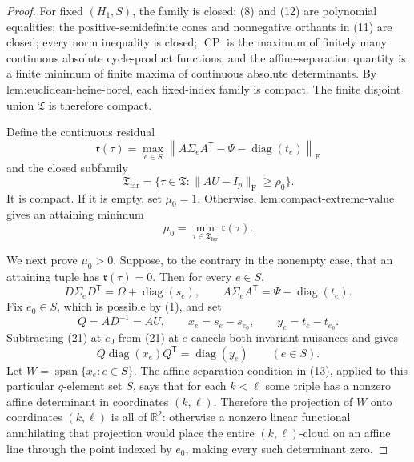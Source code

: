 \documentclass{article}
\begin{document}
\begin{proof}
For fixed \((H_1,S)\), the family is closed: (8) and (12) are polynomial equalities; the positive-semidefinite cones and nonnegative orthants in (11) are closed; every norm inequality is closed; \(\operatorname{CP}\) is the maximum of finitely many continuous absolute cycle-product functions; and the affine-separation quantity is a finite minimum of finite maxima of continuous absolute determinants. By \(\text{lem:euclidean-heine-borel}\), each fixed-index family is compact. The finite disjoint union \(\mathfrak T\) is therefore compact.

Define the continuous residual
\[
\mathfrak r(\tau)=
\max_{e\in S}
\left\|A\Sigma_eA^{\mathsf T}
-\Psi-\operatorname{diag}(t_e)\right\|_{\mathrm F}
\tag{18}
\]
and the closed subfamily
\[
\mathfrak T_{\mathrm{far}}
=\{\tau\in\mathfrak T:\|AU-I_p\|_{\mathrm F}\geq\rho_0\}.
\tag{19}
\]
It is compact. If it is empty, set \(\mu_0=1\). Otherwise, \(\text{lem:compact-extreme-value}\) gives an attaining minimum
\[
\mu_0=\min_{\tau\in\mathfrak T_{\mathrm{far}}}\mathfrak r(\tau).
\tag{20}
\]

We next prove \(\mu_0>0\). Suppose, to the contrary in the nonempty case, that an attaining tuple has \(\mathfrak r(\tau)=0\). Then for every \(e\in S\),
\[
D\Sigma_eD^{\mathsf T}=\Omega+\operatorname{diag}(s_e),
\qquad
A\Sigma_eA^{\mathsf T}=\Psi+\operatorname{diag}(t_e).
\tag{21}
\]
Fix \(e_0\in S\), which is possible by (1), and set
\[
Q=AD^{-1}=AU,
\qquad
x_e=s_e-s_{e_0},
\qquad
y_e=t_e-t_{e_0}.
\]
Subtracting (21) at \(e_0\) from (21) at \(e\) cancels both invariant nuisances and gives
\[
Q\operatorname{diag}(x_e)Q^{\mathsf T}
=\operatorname{diag}(y_e)
\qquad(e\in S).
\tag{22}
\]
Let \(W=\operatorname{span}\{x_e:e\in S\}\). The affine-separation condition in (13), applied to this particular \(q\)-element set \(S\), says that for each \(k<\ell\) some triple has a nonzero affine determinant in coordinates \((k,\ell)\). Therefore the projection of \(W\) onto coordinates \((k,\ell)\) is all of \(\mathbb R^2\): otherwise a nonzero linear functional annihilating that projection would place the entire \((k,\ell)\)-cloud on an affine line through the point indexed by \(e_0\), making every such determinant zero.


\end{proof}
\end{document}
